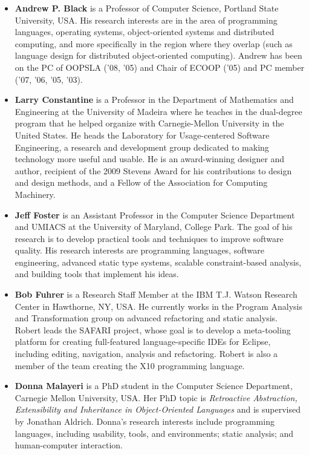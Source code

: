 \documentclass[9pt]{sigplanconf}
\begin{document}
\begin{itemize}

\item \textbf{Andrew P. Black} is a Professor of Computer Science,
  Portland State University, USA. His research interests are in the
  area of programming languages, operating systems, object-oriented
  systems and distributed computing, and more specifically in the
  region where they overlap (such as language design for distributed
  object-oriented computing). Andrew has been on the PC of OOPSLA
  ('08, '05) and Chair of ECOOP ('05) and PC member ('07, '06, '05,
  '03).

\item \textbf{Larry Constantine} is a Professor in the Department of
  Mathematics and Engineering at the University of Madeira where he
  teaches in the dual-degree program that he helped organize with
  Carnegie-Mellon University in the United States. He heads the
  Laboratory for Usage-centered Software Engineering, a research and
  development group dedicated to making technology more useful and
  usable. He is an award-winning designer and author, recipient of the
  2009 Stevens Award for his contributions to design and design
  methods, and a Fellow of the Association for Computing Machinery.

\item \textbf{Jeff Foster} is an Assistant Professor in the Computer
  Science Department and UMIACS at the University of Maryland, College
  Park. The goal of his research is to develop practical tools and
  techniques to improve software quality. His research interests are
  programming languages, software engineering, advanced static type
  systems, scalable constraint-based analysis, and building tools that
  implement his ideas.

\item \textbf{Bob Fuhrer} is a Research Staff Member at the IBM
  T.J. Watson Research Center in Hawthorne, NY, USA. He currently
  works in the Program Analysis and Transformation group on advanced
  refactoring and static analysis. Robert leads the SAFARI project,
  whose goal is to develop a meta-tooling platform for creating
  full-featured language-specific IDEs for Eclipse, including editing,
  navigation, analysis and refactoring. Robert is also a member of the
  team creating the X10 programming language.

\item \textbf{Donna Malayeri} is a PhD student in the Computer Science
  Department, Carnegie Mellon University, USA. Her PhD topic is
  \emph{Retroactive Abstraction, Extensibility and Inheritance in
    Object-Oriented Languages} and is supervised by Jonathan
  Aldrich. Donna's research interests include programming languages,
  including usability, tools, and environments; static analysis; and
  human-computer interaction.


\end{itemize}
\end{document}
